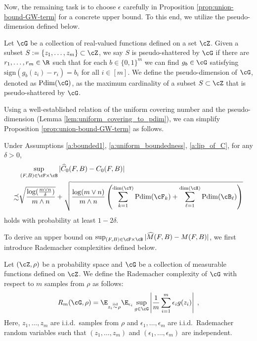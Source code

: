 \documentclass[11pt]{article}
\begin{document}
Now, the remaining task is to choose $\epsilon$ carefully in Proposition \ref{prop:union-bound-GW-term} for a concrete upper bound. To this end, we utilize the pseudo-dimension defined below.

\begin{definition}
	Let $\cG$ be a collection of real-valued functions defined on a set $\cZ$. Given a subset $S:=\{z_1, \ldots, z_m\} \subset \cZ$, we say $S$ is pseudo-shattered by $\cG$ if there are $r_1, \ldots, r_m \in \R$ such that for each $b \in \{0, 1\}^m$ we can find $g_b \in \cG$ satisfying $\mathrm{sign}(g_b(z_i) - r_i) = b_i$ for all $i \in [m]$. We define the pseudo-dimension of $\cG$, denoted as $\mathrm{Pdim}(\cG)$, as the maximum cardinality of a subset $S \subset \cZ$ that is pseudo-shattered by $\cG$.
\end{definition}

Using a well-established relation of the uniform covering number and the pseudo-dimension (Lemma \ref{lem:uniform_covering_to_pdim}), we can simplify Proposition \ref{prop:union-bound-GW-term} as follows.

\begin{corollary}
	\label{cor:union-bound-GW-term-pdim}
	Under Assumptions \ref{a:bounded1}, \ref{a:uniform_boundedness}, \ref{a:lip_of_C}, for any $\delta > 0$, 
	\begin{equation*}
		\begin{split}
			& \sup_{(F, B) \in \cF \times \cB} |\widehat{C}_0(F, B) - C_0(F, B)| \\
			\precsim
			& \sqrt{\frac{\log(\tfrac{m \vee n}{\delta})}{m \wedge n}} + \sqrt{\frac{\log(m \vee n)}{m\wedge n} \left( \sum_{k =1}^{{\rm dim}(\cY)} {\rm Pdim}(\cF_{k}) + \sum_{\ell = 1}^{{\rm dim}(\cX)} {\rm Pdim}(\cB_{\ell}) \right)}
		\end{split}
	\end{equation*}
	holds with probability at least $1 - 2 \delta$.
\end{corollary}




To derive an upper bound on $\sup_{(F,B) \in \cF \times \cB} |\widehat{M}(F, B) - M(F, B)|$, we first introduce Rademacher complexities defined below.

\begin{definition}
	Let $(\cZ, \rho)$ be a probability space and $\cG$ be a collection of measurable functions defined on $\cZ$. We define the Rademacher complexity of $\cG$ with respect to $m$ samples from $\rho$ as follows:
		\begin{equation*}
			R_m(\cG, \rho) =  \E_{z_i \overset{\mathrm{iid}}{\sim} \rho} \E_{\epsilon_i} \sup_{g \in \cG} \left|\frac{1}{m} \sum_{i=1}^{m} \epsilon_i g(z_i)\right|\;,
		\end{equation*}
		Here, $z_1, \ldots, z_m$ are i.i.d.\ samples from $\rho$ and $\epsilon_1, \ldots, \epsilon_m$ are i.i.d.\ Rademacher random variables such that $(z_1, \ldots, z_m)$ and $(\epsilon_1, \ldots, \epsilon_m)$ are independent.
\end{definition}
\end{document}
